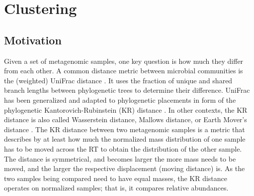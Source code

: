 
\chapter{Clustering}
\label{ch:Clustering}



\section{Motivation}
\label{ch:Clustering:sec:Motivation}

Given a set of metagenomic samples, one key question is how much they differ from each other.
A common distance metric between microbial communities
is the (weighted) UniFrac distance \cite{Lozupone2005,Lozupone2007a}.
It uses the fraction of unique and shared branch lengths between phylogenetic trees to determine their difference.
UniFrac has been generalized and adapted to phylogenetic placements
in form of the phylogenetic Kantorovich-Rubinstein (KR) distance \cite{Matsen2011a,Evans2012}.
In other contexts, the KR distance is also called Wasserstein distance, Mallows distance, or Earth Mover's distance
\cite{Mallows1972,Rachev1985,Levina2001,Villani2008}.
The KR distance between two metagenomic samples is a metric that describes
by at least how much the normalized mass distribution of one sample has to be moved across the \ac{RT}
to obtain the distribution of the other sample.
The distance is symmetrical, and becomes larger the more mass needs to be moved,
and the larger the respective displacement (moving distance) is.
As the two samples being compared need to have equal masses,
the KR distance operates on normalized samples;
that is, it compares relative abundances.

